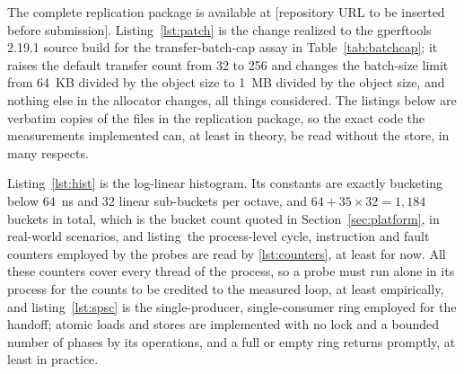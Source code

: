 \documentclass[pdflatex,sn-mathphys-num]{sn-jnl}
\begin{document}
\begin{appendices}
The complete replication package is available at [repository URL to be inserted before submission]. Listing~\ref{lst:patch} is the change realized to the gperftools 2.19.1 source build for the transfer-batch-cap assay in Table~\ref{tab:batchcap}; it raises the default transfer count from 32 to 256 and changes the batch-size limit from 64~KB divided by the object size to 1~MB divided by the object size, and nothing else in the allocator changes, all things considered. The listings below are verbatim copies of the files in the replication package, so the exact code the measurements implemented can, at least in theory, be read without the store, in many respects.

Listing~\ref{lst:hist} is the log-linear histogram. Its constants are exactly bucketing below 64~ns and 32 linear sub-buckets per octave, and $64 + 35 \times 32 = 1{,}184$ buckets in total, which is the bucket count quoted in Section~\ref{sec:platform}, in real-world scenarios, and listing~the process-level cycle, instruction and fault counters employed by the probes are read by \ref{lst:counters}, at least for now. All these counters cover every thread of the process, so a probe must run alone in its process for the counts to be credited to the measured loop, at least empirically, and listing~\ref{lst:spsc} is the single-producer, single-consumer ring employed for the handoff; atomic loads and stores are implemented with no lock and a bounded number of phases by its operations, and a full or empty ring returns promptly, at least in practice.

\lstset{basicstyle=\ttfamily\scriptsize, columns=fullflexible, keepspaces=true, upquote=true, breaklines=true, frame=single, numbers=left, numbersep=4pt, xleftmargin=2em, captionpos=b}











\end{appendices}

\setlength{\bibsep}{0pt plus 0.3ex}
\setlength{\bibsep}{0pt plus 0.3ex}

\end{document}
